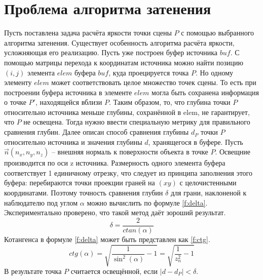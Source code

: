\section{Проблема алгоритма затенения} {
    Пусть поставлена задача расчёта яркости точки сцены $P$ с помощью
    выбранного алгоритма затенения.
    Существует особенность алгоритма расчёта яркости, усложняющая
    его реализацию.
    Пусть уже построен буфер источника $buf$.
    С помощью матрицы перехода к координатам источника можно найти позицию
    $(i, j)$ элемента $elem$ буфера $buf$, куда проецируется точка $P$.
    Но одному элементу $elem$ может соответствовать целое множество
    точек сцены.
    То есть при построении буфера источника в элементе $elem$ могла быть
    сохранена информация о точке $P'$, находящейся вблизи $P$.
    Таким образом, то, что глубина точки $P$ относительно источника
    меньше глубины, сохранённой в elem, не гарантирует, что $P$ не освещена.
    Тогда нужно ввести специальную метрику для правильного сравнения глубин.
    Далее описан способ сравнения глубины $d_P$ точки $P$ относительно
    источника и значения глубины $d$, хранящегося в буфере.
    Пусть $\vec{n}(n_x, n_y, n_z)$ -- внешняя нормаль к поверхности объекта
    в точке $P$.
    Освещние производится по оси z источника.
    Размерность одного элемента буфера соответствует 1 единичному отрезку,
    что следует из принципа заполнения этого буфера: перебираются точки
    проекции граней на $(xy)$ с целочистенными координатами.
    Поэтому точность сравнения глубин $\delta$ для грани, наклоненой к наблюдателю под углом $\alpha$ можно вычислить по формуле \ref{f:delta}.
    Экспериментально проверено, что такой метод даёт зороший результат.
    \begin{equation}
        \label{f:delta}
        \delta = \frac{2}{ctan(\alpha)}
    \end{equation}
    Котангенса в формуле \ref{f:delta} может быть представлен как \ref{f:ctg}.
    \begin{equation}
        \label{f:ctg}
        ctg(\alpha) = \sqrt{\frac{1}{\sin^2(\alpha)} - 1} = \sqrt{\frac{1}{z_n^2} - 1}
    \end{equation}
    В результате точка $P$ считается освещённой, если $|d - d_P| < \delta$.
}
